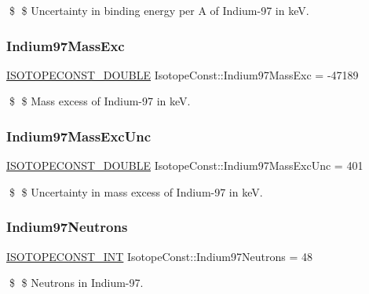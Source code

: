 \$ \$ Uncertainty in binding energy per A of Indium-\/97 in keV. \mbox{\label{group___isotope_const-_indium-_in97_ga96007021bc8c047ff09edb6160d500b4}} 
\subsubsection{\texorpdfstring{Indium97\+Mass\+Exc}{Indium97MassExc}}
{\footnotesize\ttfamily \mbox{\hyperlink{group___isotope_const-_macros_ga8f45a7272ce02c0b4c65c44636ed719a}{I\+S\+O\+T\+O\+P\+E\+C\+O\+N\+S\+T\+\_\+\+D\+O\+U\+B\+LE}} Isotope\+Const\+::\+Indium97\+Mass\+Exc = -\/47189}

\$ \$ Mass excess of Indium-\/97 in keV. \mbox{\label{group___isotope_const-_indium-_in97_ga5f1e102e203538cdaaa19d850c114445}} 
\subsubsection{\texorpdfstring{Indium97\+Mass\+Exc\+Unc}{Indium97MassExcUnc}}
{\footnotesize\ttfamily \mbox{\hyperlink{group___isotope_const-_macros_ga8f45a7272ce02c0b4c65c44636ed719a}{I\+S\+O\+T\+O\+P\+E\+C\+O\+N\+S\+T\+\_\+\+D\+O\+U\+B\+LE}} Isotope\+Const\+::\+Indium97\+Mass\+Exc\+Unc = 401}

\$ \$ Uncertainty in mass excess of Indium-\/97 in keV. \mbox{\label{group___isotope_const-_indium-_in97_gac480c77dc693f182d267efdc70e93f94}} 
\subsubsection{\texorpdfstring{Indium97\+Neutrons}{Indium97Neutrons}}
{\footnotesize\ttfamily \mbox{\hyperlink{group___isotope_const-_macros_ga5f18360b3e99483a35c32d789e62621c}{I\+S\+O\+T\+O\+P\+E\+C\+O\+N\+S\+T\+\_\+\+I\+NT}} Isotope\+Const\+::\+Indium97\+Neutrons = 48}

\$ \$ Neutrons in Indium-\/97. \mbox{\label{group___isotope_const-_indium-_in97_ga52acea406d28a909681b6cf83fde86fe}} 

